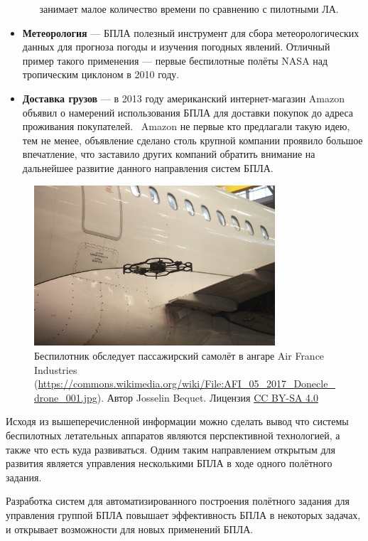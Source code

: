 \documentclass[specification,annotation]{itmo-student-thesis}
\begin{document}
\begin{itemize}
\begin{itemize}
        занимает малое количество времени по сравнению с пилотными ЛА.
    \end{itemize}
  \item \textbf{Метеорология} --- БПЛА полезный инструмент для сбора
    метеорологических данных для прогноза погоды и изучения погодных явлений.
    Отличный пример такого применения --- первые беспилотные полёты NASA над
    тропическим циклоном в 2010 году.~\cite{nasa-hurricane}
  \item \textbf{Доставка грузов} --- в 2013 году американский интернет-магазин
    Amazon объявил о намерений использования БПЛА для доставки покупок до адреса
    проживания покупателей.~\cite{cnn-amazon} Amazon не первые кто предлагали
    такую идею, тем не менее, объявление сделано столь крупной компании проявило
    большое впечатление, что заставило других компаний обратить внимание на
    дальнейшее развитие данного направления систем БПЛА.
\end{itemize}

\begin{figure}[!h]
  \caption{Беспилотник обследует пассажирский самолёт в ангаре Air France
  Industries
  (\url{https://commons.wikimedia.org/wiki/File:AFI_05_2017_Donecle_drone_001.jpg}).
  Автор Josselin Bequet. Лицензия
  \href{https://creativecommons.org/licenses/by-sa/4.0/deed.en}{CC BY-SA 4.0}
  }\label{pic:uav-inspect}
  \centering
  \includegraphics[width=0.8\textwidth]{uav-inspect}
\end{figure}

Исходя из вышеперечисленной информации можно сделать вывод что системы
беспилотных летательных аппаратов являются перспективной технологией, а также
что есть куда развиваться. Одним таким направлением открытым для развития
является управления несколькими БПЛА в ходе одного полётного задания.

Разработка систем для автоматизированного построения полётного задания для
управления группой БПЛА повышает эффективность БПЛА в некоторых задачах, и
открывает возможности для новых применений БПЛА.
\end{document}
